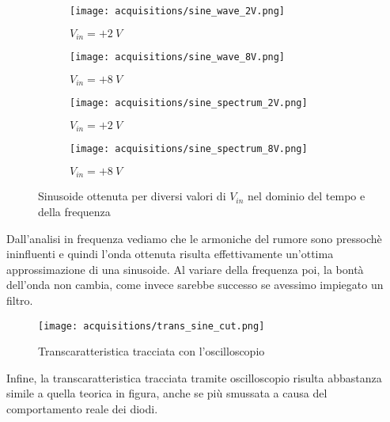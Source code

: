 \begin{figure}[H]
    \centering

    \begin{subfigure}{.5\textwidth}
        \centering
        \texttt{[image: acquisitions/sine\_wave\_2V.png]}
        \caption{$V_{in}=+2\ V$}
        \label{acq_sine_2V}
    \end{subfigure}%
    \begin{subfigure}{.5\textwidth}
        \centering
        \texttt{[image: acquisitions/sine\_wave\_8V.png]}
        \caption{$V_{in}=+8\ V$}
        \label{acq_sine_8V}
    \end{subfigure}
    \begin{subfigure}{.5\textwidth}
        \centering
        \texttt{[image: acquisitions/sine\_spectrum\_2V.png]}
        \caption{$V_{in}=+2\ V$}
        \label{acq_fourier_2V}
    \end{subfigure}%
    \begin{subfigure}{.5\textwidth}
        \centering
        \texttt{[image: acquisitions/sine\_spectrum\_8V.png]}
        \caption{$V_{in}=+8\ V$}
        \label{acq_fourier_8V}
    \end{subfigure}

    \caption{Sinusoide ottenuta per diversi valori di $V_{in}$ nel dominio del tempo e
        della frequenza}
    \label{acq_sine}
\end{figure}

Dall'analisi in frequenza vediamo che le armoniche del rumore sono pressochè ininfluenti e
quindi l'onda ottenuta risulta effettivamente un'ottima approssimazione di una sinusoide.
Al variare della frequenza poi, la bontà dell'onda non cambia, come invece sarebbe successo
se avessimo impiegato un filtro.

\begin{figure}[H]
    \centering
    \texttt{[image: acquisitions/trans\_sine\_cut.png]}
    \caption{Transcaratteristica tracciata con l'oscilloscopio}
    \label{acq_sine_oscilloscope}
\end{figure}

Infine, la transcaratteristica tracciata tramite oscilloscopio risulta abbastanza simile a
quella teorica in figura, anche se più smussata a causa del comportamento reale dei diodi.

